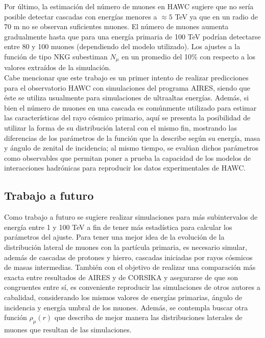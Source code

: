 Por \'ultimo, la estimaci\'on del n\'umero de muones en HAWC sugiere que no ser\'ia posible detectar cascadas con energ\'ias menores a $\approx 5$ TeV ya que en un radio de 70 m no se observan suficientes muones. El n\'umero de muones aumenta gradualmente hasta que para una energ\'ia primaria de 100 TeV podr\'ian detectarse entre 80 y 100 muones (dependiendo del modelo utilizado). Los ajustes a la funci\'on de tipo NKG subestiman $N_{\mu}$ en un promedio del 10\% con respecto a los valores extra\'idos de la simulaci\'on. \\

Cabe mencionar que este trabajo es un primer intento de realizar predicciones para el observatorio HAWC con simulaciones del programa AIRES, siendo que \'este se utiliza usualmente para simulaciones de ultraaltas energ\'ias. Adem\'as, si bien el n\'umero de muones en una cascada es com\'unmente utilizado para estimar las caracter\'isticas del rayo c\'osmico primario, aqu\'i se presenta la posibilidad de utilizar la forma de su distribuci\'on lateral con el mismo fin, mostrando las diferencias de los par\'ametros de la funci\'on que la describe seg\'un su energ\'ia, masa y \'angulo de zenital de incidencia; al mismo tiempo, se eval\'uan dichos par\'ametros como observables que permitan poner a prueba la capacidad de los modelos de interacciones hadr\'onicas para reproducir los datos experimentales de HAWC.

\subsection*{Trabajo a futuro}
Como trabajo a futuro se sugiere realizar simulaciones para m\'as subintervalos de energ\'ia entre 1 y 100 TeV a fin de tener m\'as estad\'istica para calcular los par\'ametros del ajuste. Para tener una mejor idea de la evoluci\'on de la distribuci\'on lateral de muones con la part\'icula primaria, es necesario simular, adem\'as de cascadas de protones y hierro, cascadas iniciadas por rayos c\'osmicos de masas intermedias. Tambi\'en con el objetivo de realizar una comparaci\'on m\'as exacta entre resultados de AIRES y de CORSIKA y asegurarse de que son congruentes entre s\'i, es conveniente reproducir las simulaciones de otros autores a cabalidad, considerando los mismos valores de energ\'ias primarias, \'angulo de incidencia y energ\'ia umbral de los muones. Adem\'as, se contempla buscar otra funci\'on $\rho_{\mu}(r)$ que describa de mejor manera las distribuciones laterales de muones que resultan de las simulaciones. 

\singlespacing

